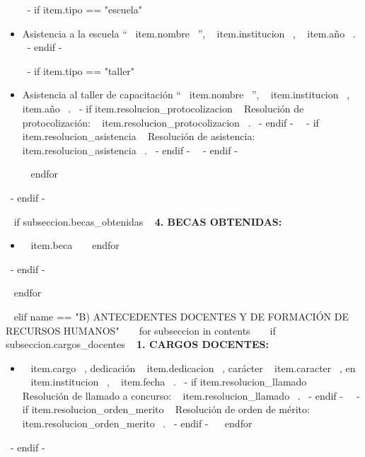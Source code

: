 \begin{itemize}
        ~{- if item.tipo == "escuela" }~
          \item Asistencia a la escuela ``~{{ item.nombre }}~'', ~{{ item.institucion }}~, ~{{ item.año }}~.
          \espacioEntreItems{}
        ~{- endif -}~

        ~{- if item.tipo == "taller" }~
          \item Asistencia al taller de capacitación ``~{{ item.nombre }}~'', ~{{ item.institucion }}~, ~{{ item.año }}~.
                ~{- if item.resolucion_protocolizacion }~ Resolución de protocolización: ~{{ item.resolucion_protocolizacion }}~. ~{- endif -}~
                ~{- if item.resolucion_asistencia }~ Resolución de asistencia: ~{{ item.resolucion_asistencia }}~. ~{- endif -}~
          \espacioEntreItems{}
        ~{- endif -}~

      ~{ endfor }~
      \end{itemize}
      \espacioEntreSubSecciones{}
    ~{- endif -}~

    ~{ if subseccion.becas_obtenidas }~
      \textbf{4. BECAS OBTENIDAS:}
      \begin{itemize}
      ~{ for item in subseccion.becas_obtenidas }~
        \item ~{{ item.beca }}~
        \espacioEntreItems{}
      ~{ endfor }~
      \end{itemize}
      \espacioEntreSubSecciones{}
    ~{- endif -}~

  ~{ endfor }~
  \espacioEntreSecciones{}

~{ elif name == "B) ANTECEDENTES DOCENTES Y DE FORMACIÓN DE RECURSOS HUMANOS" }~
  ~{ for subseccion in contents }~
    ~{ if subseccion.cargos_docentes }~
      \textbf{1. CARGOS DOCENTES:}
      \begin{itemize}
      ~{ for item in subseccion.cargos_docentes }~
        \item ~{{ item.cargo }}~, dedicación ~{{ item.dedicacion }}~, carácter ~{{ item.caracter }}~, en ~{{ item.institucion }}~, ~{{ item.fecha }}~.
              ~{- if item.resolucion_llamado }~ Resolución de llamado a concurso: ~{{ item.resolucion_llamado }}~. ~{- endif -}~
              ~{- if item.resolucion_orden_merito }~ Resolución de orden de mérito: ~{{ item.resolucion_orden_merito }}~. ~{- endif -}~
        \espacioEntreItems{}
      ~{ endfor }~
      \end{itemize}
      \espacioEntreSubSecciones{}
    ~{- endif -}~

